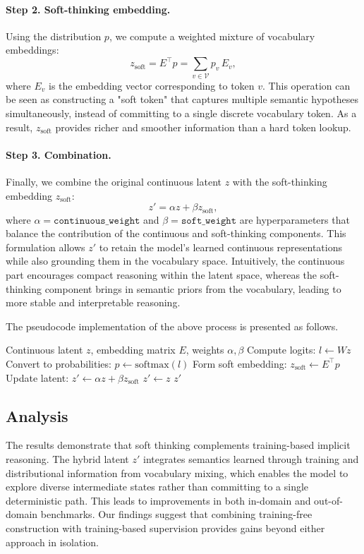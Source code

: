 \paragraph{Step 2. Soft-thinking embedding.}  
Using the distribution $p$, we compute a weighted mixture of vocabulary embeddings:
\[
z_{\text{soft}} = E^\top p = \sum_{v \in \mathcal{V}} p_v \, E_v ,
\]
where $E_v$ is the embedding vector corresponding to token $v$.  
This operation can be seen as constructing a "soft token" that captures multiple semantic hypotheses simultaneously, instead of committing to a single discrete vocabulary token. As a result, $z_{\text{soft}}$ provides richer and smoother information than a hard token lookup.

\paragraph{Step 3. Combination.}  
Finally, we combine the original continuous latent $z$ with the soft-thinking embedding $z_{\text{soft}}$:
\[
z' = \alpha z + \beta z_{\text{soft}},
\]
where $\alpha = \texttt{continuous\_weight}$ and $\beta = \texttt{soft\_weight}$ are hyperparameters that balance the contribution of the continuous and soft-thinking components.  
This formulation allows $z'$ to retain the model’s learned continuous representations while also grounding them in the vocabulary space. Intuitively, the continuous part encourages compact reasoning within the latent space, whereas the soft-thinking component brings in semantic priors from the vocabulary, leading to more stable and interpretable reasoning.  

The pseudocode implementation of the above process is presented as follows.

\begin{algorithm}[h]
\caption{Soft Thinking with Continuous Tokens}
\label{alg:soft-thinking}
\begin{algorithmic}[1]
\Require Continuous latent $z$, embedding matrix $E$, weights $\alpha, \beta$
    \State Compute logits: $l \gets Wz$
    \State Convert to probabilities: $p \gets \text{softmax}(l)$
    \State Form soft embedding: $z_{\text{soft}} \gets E^\top p$
    \State Update latent: $z' \gets \alpha z + \beta z_{\text{soft}}$
\Else
    \State $z' \gets z$
\EndIf
\State \Return $z'$
\end{algorithmic}
\end{algorithm}


\subsection{Analysis}
The results demonstrate that soft thinking complements training-based implicit reasoning.
The hybrid latent $z'$ integrates semantics learned through training and distributional information from vocabulary mixing, which enables the model to explore diverse intermediate states rather than committing to a single deterministic path.
This leads to improvements in both in-domain and out-of-domain benchmarks.  
Our findings suggest that combining training-free construction with training-based supervision provides gains beyond either approach in isolation.

